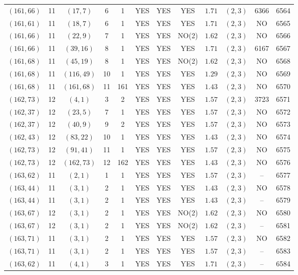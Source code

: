 \begin{longtable}{|c|c|c|c|c|c|c|c|c|c|c|c|}
$(161,66)$ & 11 & $(17,7)$ & 6 & 1 & YES & YES & YES & $1.71$ & $(2,3)$ & 6366 & 6564\\
$(161,61)$ & 11 & $(18,7)$ & 6 & 1 & YES & YES & YES & $1.71$ & $(2,3)$ & NO & 6565\\
$(161,66)$ & 11 & $(22,9)$ & 7 & 1 & YES & YES & NO(2) & $1.62$ & $(2,3)$ & NO & 6566\\
$(161,66)$ & 11 & $(39,16)$ & 8 & 1 & YES & YES & YES & $1.71$ & $(2,3)$ & 6167 & 6567\\
$(161,68)$ & 11 & $(45,19)$ & 8 & 1 & YES & YES & NO(2) & $1.62$ & $(2,3)$ & NO & 6568\\
$(161,68)$ & 11 & $(116,49)$ & 10 & 1 & YES & YES & YES & $1.29$ & $(2,3)$ & NO & 6569\\
$(161,68)$ & 11 & $(161,68)$ & 11 & 161 & YES & YES & YES & $1.43$ & $(2,3)$ & NO & 6570\\
$(162,73)$ & 12 & $(4,1)$ & 3 & 2 & YES & YES & YES & $1.57$ & $(2,3)$ & 3723 & 6571\\
$(162,37)$ & 12 & $(23,5)$ & 7 & 1 & YES & YES & YES & $1.57$ & $(2,3)$ & NO & 6572\\
$(162,37)$ & 12 & $(40,9)$ & 9 & 2 & YES & YES & YES & $1.57$ & $(2,3)$ & NO & 6573\\
$(162,43)$ & 12 & $(83,22)$ & 10 & 1 & YES & YES & YES & $1.43$ & $(2,3)$ & NO & 6574\\
$(162,73)$ & 12 & $(91,41)$ & 11 & 1 & YES & YES & YES & $1.57$ & $(2,3)$ & NO & 6575\\
$(162,73)$ & 12 & $(162,73)$ & 12 & 162 & YES & YES & YES & $1.43$ & $(2,3)$ & NO & 6576\\
$(163,62)$ & 11 & $(2,1)$ & 1 & 1 & YES & YES & YES & $1.57$ & $(2,3)$ & -- & 6577\\
$(163,44)$ & 11 & $(3,1)$ & 2 & 1 & YES & YES & YES & $1.43$ & $(2,3)$ & NO & 6578\\
$(163,44)$ & 11 & $(3,1)$ & 2 & 1 & YES & YES & YES & $1.43$ & $(2,3)$ & -- & 6579\\
$(163,67)$ & 12 & $(3,1)$ & 2 & 1 & YES & YES & NO(2) & $1.62$ & $(2,3)$ & NO & 6580\\
$(163,67)$ & 12 & $(3,1)$ & 2 & 1 & YES & YES & NO(2) & $1.62$ & $(2,3)$ & -- & 6581\\
$(163,71)$ & 11 & $(3,1)$ & 2 & 1 & YES & YES & YES & $1.57$ & $(2,3)$ & NO & 6582\\
$(163,71)$ & 11 & $(3,1)$ & 2 & 1 & YES & YES & YES & $1.57$ & $(2,3)$ & -- & 6583\\
$(163,62)$ & 11 & $(4,1)$ & 3 & 1 & YES & YES & YES & $1.71$ & $(2,3)$ & -- & 6584\\

\end{longtable}
